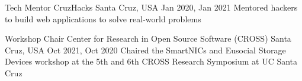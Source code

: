

\begin{cventries}

  \cventry
    {Tech Mentor} %
    {CruzHacks} %
    {Santa Cruz, USA} %
    {Jan 2020, Jan 2021} %
    {Mentored hackers to build web applications to solve real-world problems}

  \cventry
    {Workshop Chair} %
    {Center for Research in Open Source Software (CROSS)} %
    {Santa Cruz, USA} %
    {Oct 2021, Oct 2020} %
    {Chaired the SmartNICs and Eusocial Storage Devices workshop at the 5th and 6th CROSS Research Symposium at UC Santa Cruz}

\end{cventries}
